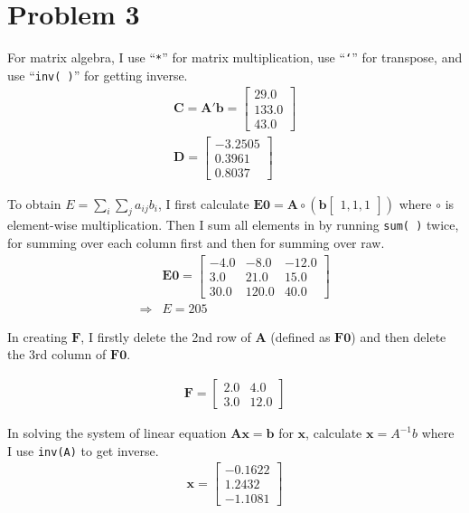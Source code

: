 \documentclass[11pt,letter]{article}
\newcommand{\vect}[1]{\boldsymbol{\mathbf{#1}}}
\newcounter{lem}[section] \setcounter{lem}{0}
\newcommand{\prn}[1]{\left({#1}\right)}
\newcommand{\bmat}[1]{\begin{bmatrix} #1 \end{bmatrix}}%
\newcommand{\code}[1]{\texttt{#1}}
\begin{document}
\section*{Problem 3}

For matrix algebra, I use ``\code{*}'' for matrix multiplication, use ``\code{`}'' for transpose, and use ``\code{inv( )}'' for getting inverse. 
\begin{align*}
\vect{C} = \vect{A}'\vect{b} = \left[\begin{array}{r} 29.0\\ 133.0\\ 43.0 \end{array}\right]\\
\vect{D} = \left[\begin{array}{r} -3.2505\\ 0.3961\\ 0.8037 \end{array}\right]
\end{align*}

To obtain ${E} =\sum_i \sum_j a_{ij} b_{i}$, I first calculate $\vect{E0} = \vect{A} \circ \prn{\vect{b}\bmat{1,1,1}}$ where $\circ$ is element-wise multiplication. Then I sum all elements in \vect{E0} by running \code{sum( )} twice, for summing over each column first and then for summing over raw.
\begin{align*}
&\vect{E0} = \left[\begin{array}{rrr} -4.0 & -8.0 & -12.0\\ 3.0 & 21.0 & 15.0\\ 30.0 & 120.0 & 40.0 \end{array}\right]\\
\Rightarrow &E = 205
\end{align*}

In creating $\vect{F}$, I firstly delete the 2nd row of $\vect{A}$ (defined as $\vect{F0}$) and then delete the 3rd column of $\vect{F0}$. 

\begin{align*}
\vect{F} = \left[\begin{array}{rr} 2.0 & 4.0\\ 3.0 & 12.0 \end{array}\right]
\end{align*}

In solving the system of linear equation $\vect{A}\vect{x} = \vect{b}$ for $\vect{x}$, calculate $\vect{x} = A^{-1}b$ where I use \code{inv(A)} to get inverse. 
\begin{align*}
\vect{x} = \left[\begin{array}{r} -0.1622\\ 1.2432\\ -1.1081 \end{array}\right]
\end{align*}
\end{document}

